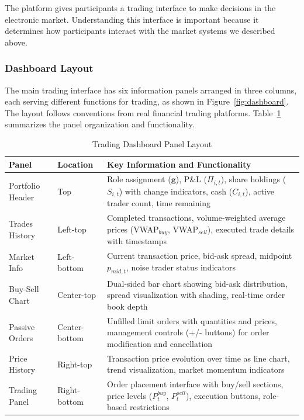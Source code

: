 The platform gives participants a trading interface to make decisions in the electronic market. Understanding this interface is important because it determines how participants interact with the market systems we described above.

\subsubsection{Dashboard Layout}

The main trading interface has six information panels arranged in three columns, each serving different functions for trading, as shown in Figure~\ref{fig:dashboard}. The layout follows conventions from real financial trading platforms. Table~\ref{tab:dashboard} summarizes the panel organization and functionality.

\begin{table}[ht]
\centering
\caption{Trading Dashboard Panel Layout}
\label{tab:dashboard}
\begin{tabular}{p{}p{}p{}}
\toprule
Panel & Location & Key Information and Functionality \\
\midrule
Portfolio Header & Top & Role assignment ($\mathbf{g}$), P\&L ($\Pi_{i,t}$), share holdings ($S_{i,t}$) with change indicators, cash ($C_{i,t}$), active trader count, time remaining \\
\midrule
Trades History & Left-top & Completed transactions, volume-weighted average prices (VWAP$_{buy}$, VWAP$_{sell}$), executed trade details with timestamps \\
\midrule
Market Info & Left-bottom & Current transaction price, bid-ask spread, midpoint $p_{mid,t}$, noise trader status indicators \\
\midrule
Buy-Sell Chart & Center-top & Dual-sided bar chart showing bid-ask distribution, spread visualization with shading, real-time order book depth \\
\midrule
Passive Orders & Center-bottom & Unfilled limit orders with quantities and prices, management controls (+/- buttons) for order modification and cancellation \\
\midrule
Price History & Right-top & Transaction price evolution over time as line chart, trend visualization, market momentum indicators \\
\midrule
Trading Panel & Right-bottom & Order placement interface with buy/sell sections, price levels ($P_t^{buy}$, $P_t^{sell}$), execution buttons, role-based restrictions \\
\bottomrule
\end{tabular}
\end{table}

